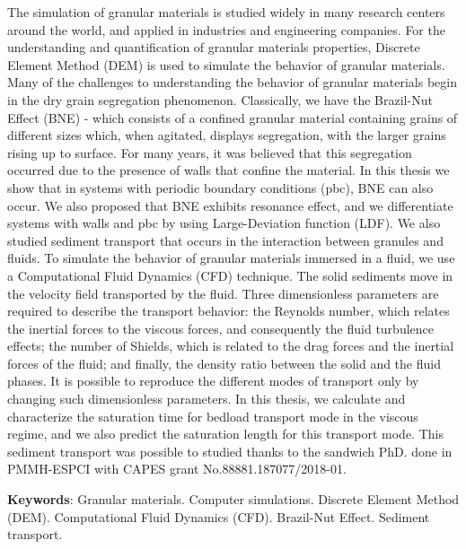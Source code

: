 
\begin{resumo}[Abstract]
    The simulation of granular materials is studied widely in many research centers around the world, and applied in industries and engineering companies. For the understanding and quantification of granular materials properties, Discrete Element Method (DEM) is used to simulate the behavior of granular materials.
    Many of the challenges to understanding the behavior of granular materials begin in the dry grain segregation phenomenon. Classically, we have the Brazil-Nut Effect (BNE) - which consists of a confined granular material containing grains of different sizes which, when agitated, displays segregation, with the larger grains rising up to surface. For many years, it was believed that this segregation occurred due to the presence of walls that confine the material. In this thesis we show that in systems with periodic boundary conditions (pbc), BNE can also occur. We also proposed that BNE exhibits resonance effect, and we differentiate systems with walls and pbc by using Large-Deviation function (LDF).
    We also studied sediment transport that occurs in the interaction between granules and fluids. To simulate the behavior of granular materials immersed in a fluid, we use a Computational Fluid Dynamics (CFD) technique. The solid sediments move in the velocity field transported by the fluid. Three dimensionless parameters are required to describe the transport behavior: the Reynolds number, which relates the inertial forces to the viscous forces, and consequently the fluid turbulence effects; the number of Shields, which is related to the drag forces and the inertial forces of the fluid; and finally, the density ratio between the solid and the fluid phases. It is possible to reproduce the different modes of transport only by changing such dimensionless parameters. In this thesis, we calculate and characterize the saturation time for bedload transport mode in the viscous regime, and we also predict the saturation length for this transport mode. This sediment transport was possible to studied thanks to the sandwich PhD. done in PMMH-ESPCI with CAPES grant No.88881.187077/2018-01.

    \textbf{Keywords}: Granular materials. Computer simulations. Discrete Element Method (DEM). Computational Fluid Dynamics (CFD). Brazil-Nut Effect. Sediment transport.
\end{resumo}

